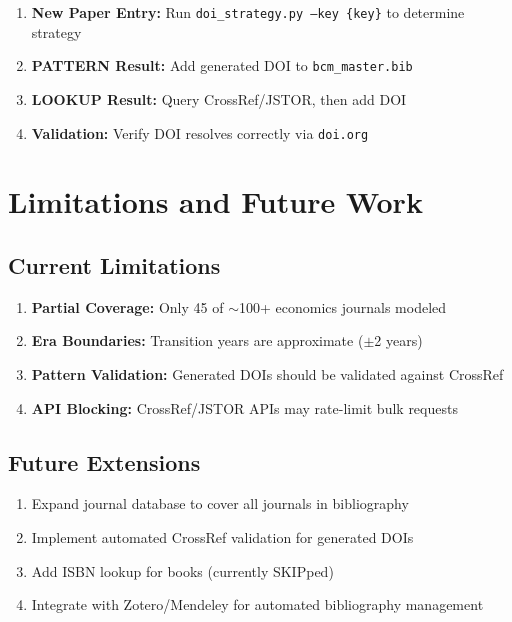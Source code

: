 \begin{enumerate}
    \item \textbf{New Paper Entry:} Run \texttt{doi\_strategy.py --key \{key\}} to determine strategy
    \item \textbf{PATTERN Result:} Add generated DOI to \texttt{bcm\_master.bib}
    \item \textbf{LOOKUP Result:} Query CrossRef/JSTOR, then add DOI
    \item \textbf{Validation:} Verify DOI resolves correctly via \texttt{doi.org}
\end{enumerate}

\section{Limitations and Future Work}
\label{sec:limitations}

\subsection{Current Limitations}

\begin{enumerate}
    \item \textbf{Partial Coverage:} Only 45 of $\sim$100+ economics journals modeled
    \item \textbf{Era Boundaries:} Transition years are approximate ($\pm$2 years)
    \item \textbf{Pattern Validation:} Generated DOIs should be validated against CrossRef
    \item \textbf{API Blocking:} CrossRef/JSTOR APIs may rate-limit bulk requests
\end{enumerate}

\subsection{Future Extensions}

\begin{enumerate}
    \item Expand journal database to cover all journals in bibliography
    \item Implement automated CrossRef validation for generated DOIs
    \item Add ISBN lookup for books (currently SKIPped)
    \item Integrate with Zotero/Mendeley for automated bibliography management
\end{enumerate}

